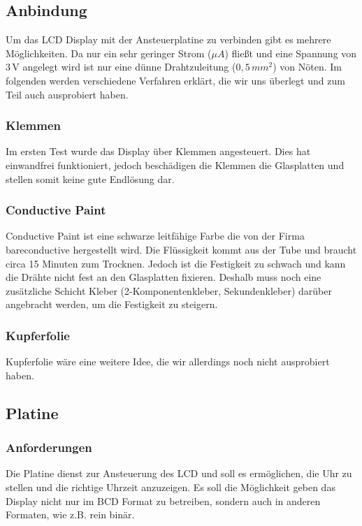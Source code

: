 \subsection{Anbindung}
Um das LCD Display mit der Ansteuerplatine zu verbinden gibt es mehrere Möglichkeiten. Da nur ein sehr geringer Strom (\(\mu A\)) fließt und eine Spannung von \(3\,\textrm{V}\) angelegt wird ist nur eine dünne Drahtzuleitung (\(0,5\, mm^2\)) von Nöten. Im folgenden werden verschiedene Verfahren erklärt, die wir uns überlegt und zum Teil auch ausprobiert haben.

\subsubsection{Klemmen}
Im ersten Test wurde das Display über Klemmen angesteuert. Dies hat einwandfrei funktioniert, jedoch beschädigen die Klemmen die Glasplatten und stellen somit keine gute Endlösung dar.

\subsubsection{Conductive Paint}
Conductive Paint ist eine schwarze leitfähige Farbe die von der Firma bareconductive hergestellt wird. Die Flüssigkeit kommt aus der Tube und braucht circa 15 Minuten zum Trocknen. Jedoch ist die Festigkeit zu schwach und kann die Drähte nicht fest an den Glasplatten fixieren. Deshalb muss noch eine zusätzliche Schicht Kleber (2-Komponentenkleber, Sekundenkleber) darüber angebracht werden, um die Festigkeit zu steigern.

\subsubsection{Kupferfolie}
Kupferfolie wäre eine weitere Idee, die wir allerdings noch nicht ausprobiert haben.


\subsection{Platine}

\subsubsection{Anforderungen}
Die Platine dienst zur Ansteuerung des LCD und soll es ermöglichen, die Uhr zu stellen und die richtige Uhrzeit anzuzeigen. Es soll die Möglichkeit geben das Display nicht nur im BCD Format zu betreiben, sondern auch in anderen Formaten, wie z.B. rein binär.

